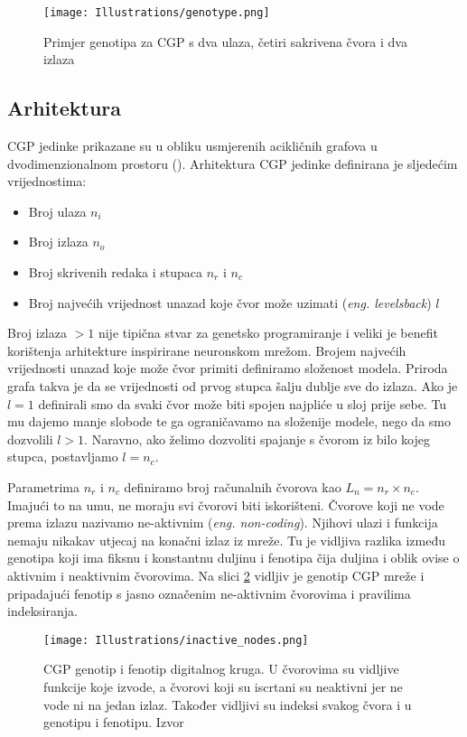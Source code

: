 \begin{figure}
	\centering
	\texttt{[image: Illustrations/genotype.png]}
	\caption{Primjer genotipa za CGP s dva ulaza, četiri sakrivena čvora i dva izlaza}
	\label{fig:genotype}
\end{figure}

\subsection{Arhitektura}
CGP jedinke prikazane su u obliku usmjerenih acikličnih grafova u dvodimenzionalnom prostoru (\cite{cgp}).
Arhitektura CGP jedinke definirana je sljedećim vrijednostima:
\begin{itemize}
	\item Broj ulaza $n_i$
	\item Broj izlaza $n_o$
	\item Broj skrivenih redaka i stupaca $n_r$ i $n_c$
	\item Broj najvećih vrijednost unazad koje čvor može uzimati (\emph{eng. levelsback}) $l$
\end{itemize}
Broj izlaza $>1$ nije tipična stvar za genetsko programiranje i veliki je benefit korištenja arhitekture inspirirane neuronskom mrežom.
Brojem najvećih vrijednosti unazad koje može čvor primiti definiramo složenost modela.
Priroda grafa takva je da se vrijednosti od prvog stupca šalju dublje sve do izlaza.
Ako je $l = 1$ definirali smo da svaki čvor može biti spojen najpliće u sloj prije sebe.
Tu mu dajemo manje slobode te ga ograničavamo na složenije modele, nego da smo dozvolili $l > 1$.
Naravno, ako želimo dozvoliti spajanje s čvorom iz bilo kojeg stupca, postavljamo  $l=n_c$.

Parametrima $n_r$ i $n_c$ definiramo broj računalnih čvorova kao $L_n = n_r \times n_c$.
Imajući to na umu, ne moraju svi čvorovi biti iskorišteni.
Čvorove koji ne vode prema izlazu nazivamo ne-aktivnim (\emph{eng. non-coding}).
Njihovi ulazi i funkcija nemaju nikakav utjecaj na konačni izlaz iz mreže.
Tu je vidljiva razlika između genotipa koji ima fiksnu i konstantnu duljinu i fenotipa čija duljina i oblik ovise o aktivnim i neaktivnim čvorovima.
Na slici \ref{fig:cgp_gene_feno} vidljiv je genotip CGP mreže i pripadajući fenotip s jasno označenim ne-aktivnim čvorovima i pravilima indeksiranja.

\begin{figure}
	\centering
	\texttt{[image: Illustrations/inactive\_nodes.png]}
	\caption{CGP genotip i fenotip digitalnog kruga. U čvorovima su vidljive funkcije koje izvode, a čvorovi koji su iscrtani su neaktivni jer ne vode ni na jedan izlaz. Također vidljivi su indeksi svakog čvora i u genotipu i fenotipu. Izvor \cite{cgp}}
	\label{fig:cgp_gene_feno}
\end{figure}


